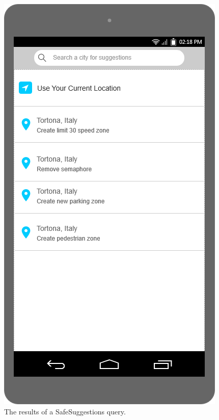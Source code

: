 \documentclass[./main.tex]{subfiles}
\begin{document}
\begin{figure}
\begin{minipage}[t]{\mockupdimension}
        \label{fig:filter1}
    \end{minipage}
    \hfill
    \begin{minipage}[t]{\mockupdimension}
        \includegraphics[width=\textwidth]{resources/Mockups/suggestions}
        \caption{The results of a SafeSuggestions query.}
        \label{fig:suggestions}
    \end{minipage}
\end{figure}
\end{document}
